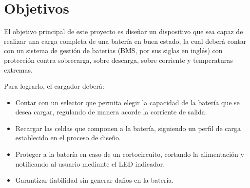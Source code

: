 \section{Objetivos}

El objetivo principal de este proyecto es diseñar un dispositivo que sea capaz de realizar una carga completa de una batería 
en buen estado, la cual deberá contar con un sistema de gestión de baterías (BMS, por sus siglas en inglés)
con protección contra sobrecarga, sobre descarga, sobre corriente y temperaturas extremas.

Para lograrlo, el cargador deberá:
\begin{itemize}
    \item Contar con un selector que permita elegir la capacidad de la batería que se desea cargar, regulando de manera acorde la corriente de salida.
    \item Recargar las celdas que componen a la batería, siguiendo un perfil de carga establecido en el proceso de diseño.
    \item Proteger a la batería en caso de un cortocircuito, cortando la alimentación y notificando al usuario mediante el LED indicador.
    \item Garantizar fiabilidad sin generar daños en la batería.
\end{itemize}